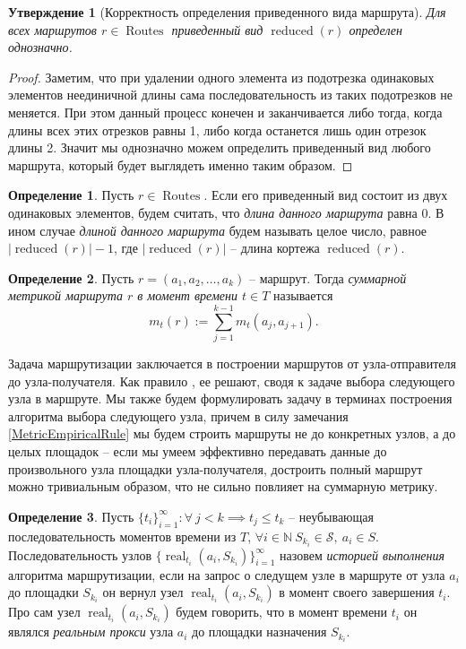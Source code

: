 \documentclass{article}
\theoremstyle{plain}
\theoremstyle{plain}
\theoremstyle{plain}
\theoremstyle{plain}
\newtheorem{claim}{Утверждение}[section]
\theoremstyle{definition}
\newtheorem{definition}{Определение}[section]
\theoremstyle{remark}
\theoremstyle{plain}
\DeclareMathOperator*{\real}{real}
\DeclareMathOperator*{\routes}{Routes}
\DeclareMathOperator*{\reduced}{reduced}
\begin{document}
\begin{claim}[Корректность определения приведенного вида маршрута]
    Для всех маршрутов $r \in \routes$ приведенный вид $\reduced(r)$ определен однозначно.
\end{claim}
\begin{proof}
    Заметим, что при удалении одного элемента из подотрезка одинаковых элементов неединичной длины сама последовательность из таких подотрезков не меняется. При этом данный процесс конечен и заканчивается либо тогда, когда длины всех этих отрезков равны 1, либо когда останется лишь один отрезок длины 2. Значит мы однозначно можем определить приведенный вид любого маршрута, который будет выглядеть именно таким образом.
\end{proof}

\begin{definition}
    Пусть $r \in \routes$. Если его приведенный вид состоит из двух одинаковых элементов, будем считать, что \textit{длина данного маршрута} равна 0. В ином случае \textit{длиной данного маршрута} будем называть целое число, равное $|\reduced(r)| - 1$, где $|\reduced(r)|$ -- длина кортежа $\reduced(r)$.
\end{definition}

\begin{definition}
\label{RouteMetricDefinition}
    Пусть $r = (a_1, a_2, \ldots, a_k)$ -- маршрут. Тогда \textit{суммарной метрикой маршрута $r$ в момент времени $t \in T$} называется 
    \[
        m_t(r) := \displaystyle \sum_{j = 1}^{k - 1} m_t(a_{j}, a_{j + 1}).
    \]
\end{definition}

Задача маршрутизации заключается в построении маршрутов от узла-отправителя до узла-получателя. Как правило \cite{RFC2328, RFC2453}, ее решают, сводя к задаче выбора следующего узла в маршруте. Мы также будем формулировать задачу в терминах построения алгоритма выбора следующего узла, причем в силу замечания \ref{MetricEmpiricalRule} мы будем строить маршруты не до конкретных узлов, а до целых площадок -- если мы умеем эффективно передавать данные до произвольного узла площадки узла-получателя, достроить полный маршрут можно тривиальным образом, что не сильно повлияет на суммарную метрику.

\begin{definition}
    Пусть $\{t_i\}_{i = 1}^{\infty} : \forall\ j < k \implies t_j \leq t_k$ -- неубывающая последовательность моментов времени из $T$, $\forall i \in \mathbb{N}\ S_{k_i} \in \mathcal{S},\ a_i \in S$. Последовательность узлов $\{\real_{t_i}(a_i, S_{k_i})\}_{i = 1}^{\infty}$ назовем \textit{историей выполнения} алгоритма маршрутизации, если на запрос о следущем узле в маршруте от узла $a_i$ до площадки $S_{k_i}$ он вернул узел $\real_{t_i}(a_i, S_{k_i})$ в момент своего завершения $t_i$. Про сам узел $\real_{t_i}(a_i, S_{k_i})$ будем говорить, что в момент времени $t_i$ он являлся \textit{реальным прокси} узла $a_i$ до площадки назначения $S_{k_i}$.
\end{definition}
\end{document}
